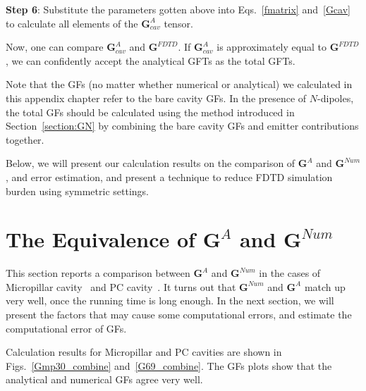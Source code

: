 \textbf{Step 6}: Substitute the parameters gotten above into Eqs.~\ref{fmatrix} and~\ref{Gcav} to calculate all elements of the $\mathbf{G}^{A}_{cav}$ tensor.



Now, one can compare $\mathbf{G}^{A}_{cav}$ and $\mathbf{G}^{FDTD}$.
If $\mathbf{G}^{A}_{cav}$ is approximately equal to $\mathbf{G}^{FDTD}$,
we can confidently accept the analytical GFTs as the total GFTs.


Note that the GFs (no matter whether numerical or analytical) we calculated in this appendix chapter refer to the bare cavity GFs. In the presence of $N$-dipoles, the total GFs should be calculated using the method introduced in Section~\ref{section:GN} by combining the bare cavity GFs and emitter contributions together.

Below, we will present our calculation results on the comparison of $\mathbf{G}^{A}$ and $\mathbf{G}^{Num}$, and error estimation, and present a technique to reduce FDTD simulation burden using symmetric settings.




\section{The Equivalence of $\mathbf{G}^{A}$ and $\mathbf{G}^{Num}$}\label{section:verifyGAGN}

This section reports a comparison between $\mathbf{G}^{A}$ and $\mathbf{G}^{Num}$ in the cases of Micropillar cavity~\cite{Reitzenstein2007} and PC cavity~\cite{Akahane2003}. It turns out that $\mathbf{G}^{Num}$ and $\mathbf{G}^{A}$ match up very well, once the running time is long enough. In the next section, we will present the factors that may cause some computational errors, and estimate the computational error of GFs.

Calculation results for Micropillar and PC cavities are shown in Figs.~\ref{Gmp30_combine} and~\ref{G69_combine}. The GFs plots show that the analytical and numerical GFs agree very well.

